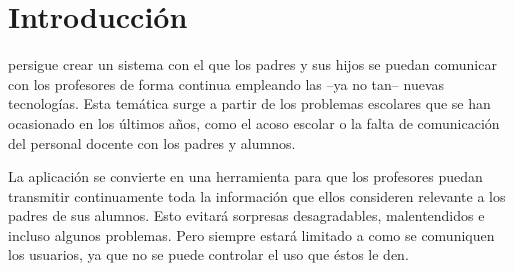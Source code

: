 %
%
%
%

\cleardoublepage
\chapter{Introducción}
\label{chap:intorduction}

\CollegeApp persigue crear un sistema con el que los padres y sus hijos se puedan comunicar con los profesores de forma continua empleando las --ya no tan-- nuevas tecnologías. Esta temática surge a partir de los problemas escolares que se han ocasionado en los últimos años, como el acoso escolar o la falta de comunicación del personal docente con los padres y alumnos.

\bigskip
La aplicación se convierte en una herramienta para que los profesores puedan transmitir continuamente toda la información que ellos consideren relevante a los padres de sus alumnos. Esto evitará sorpresas desagradables, malentendidos e incluso algunos problemas.
Pero siempre estará limitado a como se comuniquen los usuarios, ya que no se puede controlar el uso que éstos le den.

